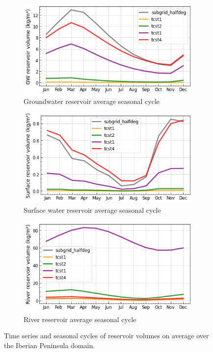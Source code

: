 \begin{figure}[htbp]
    \begin{subfigure}[b]{0.32\textwidth}
        \caption{Groundwater reservoir average seasonal cycle}
        \includegraphics[width=\textwidth]{images/chap3/time_series/slowr_seasonal_cycle_tcsts.png}
    \end{subfigure}
    \begin{subfigure}[b]{0.32\textwidth}
        \caption{Surface water reservoir average seasonal cycle}
        \includegraphics[width=\textwidth]{images/chap3/time_series/fastr_seasonal_cycle_tcsts.png}
    \end{subfigure}
    \begin{subfigure}[b]{0.32\textwidth}
        \caption{River reservoir average seasonal cycle}
        \includegraphics[width=\textwidth]{images/chap3/time_series/streamr_seasonal_cycle_tcsts.png}
    \end{subfigure}
    \caption{Time series and seasonal cycles of reservoir volumes on average over the Iberian Peninsula domain.}
    \label{fig:reservoir_time_series_tcsts}
\end{figure}

